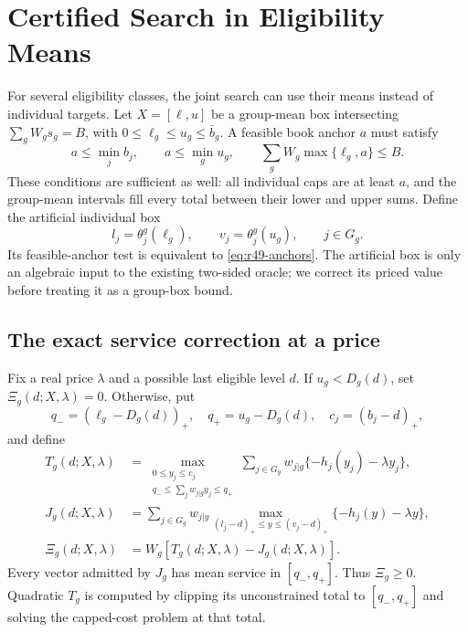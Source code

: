 \section{Certified Search in Eligibility Means}\label{sec:r49-boxes}
For several eligibility classes, the joint search can use their means instead of individual targets. Let $X=[\ell,u]$ be a group-mean box intersecting $\sum_gW_gs_g=B$, with $0\leq\ell_g\leq u_g\leq\bar b_g$. A feasible book anchor $a$ must satisfy
\begin{equation}\label{eq:r49-anchors}
 a\leq\min_j b_j,\qquad a\leq\min_g u_g,\qquad
 \sum_gW_g\max\{\ell_g,a\}\leq B.
\end{equation}
These conditions are sufficient as well: all individual caps are at least $a$, and the group-mean intervals fill every total between their lower and upper sums. Define the artificial individual box
\begin{equation}\label{eq:r49-artificial}
 l_j=\theta_j^g(\ell_g),\qquad v_j=\theta_j^g(u_g),\qquad j\in G_g.
\end{equation}
Its feasible-anchor test is equivalent to \eqref{eq:r49-anchors}. The artificial box is only an algebraic input to the existing two-sided oracle; we correct its priced value before treating it as a group-box bound.

\subsection{The exact service correction at a price}
Fix a real price $\lambda$ and a possible last eligible level $d$. If $u_g<D_g(d)$, set $\Xi_g(d;X,\lambda)=0$. Otherwise, put
\[
 q_-=(\ell_g-D_g(d))_+,\quad q_+=u_g-D_g(d),\quad
 c_j=(b_j-d)_+,
\]
and define
\begin{align}
 T_g(d;X,\lambda)
 &=\max_{\substack{0\leq y_j\leq c_j\\q_-\leq\sum_jw_{j|g}y_j\leq q_+}}
       \sum_{j\in G_g}w_{j|g}\{-h_j(y_j)-\lambda y_j\},\label{eq:r49-T}\\
 J_g(d;X,\lambda)
 &=\sum_{j\in G_g}w_{j|g}
   \max_{(l_j-d)_+\leq y\leq(v_j-d)_+}\{-h_j(y)-\lambda y\},\label{eq:r49-J}\\
 \Xi_g(d;X,\lambda)&=W_g[T_g(d;X,\lambda)-J_g(d;X,\lambda)].\label{eq:r49-Xi}
\end{align}
Every vector admitted by $J_g$ has mean service in $[q_-,q_+]$. Thus $\Xi_g\geq0$. Quadratic $T_g$ is computed by clipping its unconstrained total to $[q_-,q_+]$ and solving the capped-cost problem at that total.

